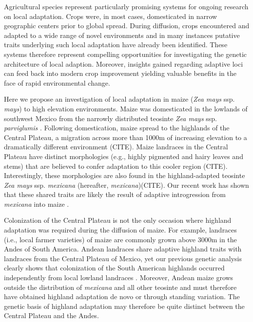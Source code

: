 Agricultural species represent particularly promising systems for ongoing research on local adaptation.  Crops were, in most cases, domesticated in narrow geographic centers prior to global spread.  During diffusion, crops encountered and adapted to a wide range of novel environments and in many instances putative traits underlying such local adaptation have already been identified.  These systems therefore represent compelling opportunities for investigating the genetic architecture of local adaption.  Moreover, insights gained regarding adaptive loci can feed back into modern crop improvement yielding valuable benefits in the face of  rapid environmental change.

Here we propose an investigation of local adaptation in maize (\emph{Zea mays} ssp. \emph{mays}) to high elevation environments.  Maize was domesticated in the lowlands of southwest Mexico from the narrowly distributed teosinte \emph{Zea mays} ssp. \emph{parviglumis} \citep[hereafter, \emph{parviglumis}][]{Matsuoka2002}.  Following domestication, maize spread to the highlands of the Central Plateau, a migration across more than 1000m of increasing elevation to a dramatically different environment (CITE).  Maize landraces in the Central Plateau have distinct morphologies (e.g., highly pigmented and hairy leaves and stems) that are believed to confer adaptation to this cooler region (CITE).  Interestingly, these morphologies are also found in the highland-adapted teosinte \emph{Zea mays} ssp. \emph{mexicana} (hereafter, \emph{mexicana})(CITE).  Our recent work has shown that these shared traits are likely the result of adaptive introgression from \emph{mexicana} into maize \citep{Hufford2013}.  

Colonization of the Central Plateau is not the only occasion where highland adaptation was required during the diffusion of maize.  For example, landraces (i.e., local farmer varieties) of maize are commonly grown above 3000m in the Andes of South America.  Andean landraces share adaptive highland traits with landraces from the Central Plateau of Mexico, yet our previous genetic analysis clearly shows that colonization of the South American highlands occurred independently from local lowland landraces \citep{vanheerwaarden2011a}.  Moreover, Andean maize grows outside the distribution of \emph{mexicana} and all other teosinte and must therefore have obtained highland adaptation de novo or through standing variation.  The genetic basis of highland adaptation may therefore be quite distinct between the Central Plateau and the Andes.

